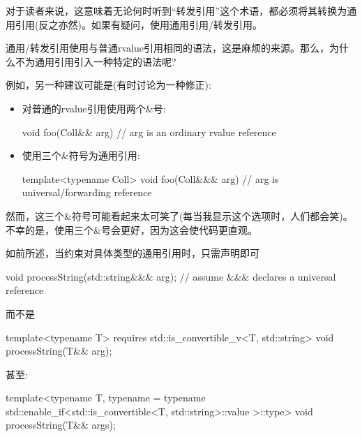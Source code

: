 对于读者来说，这意味着无论何时听到“转发引用”这个术语，都必须将其转换为通用引用(反之亦然)。如果有疑问，使用通用引用/转发引用。\par


通用/转发引用使用与普通rvalue引用相同的语法，这是麻烦的来源。那么，为什么不为通用引用引入一种特定的语法呢?\par

例如，另一种建议可能是(有时讨论为一种修正):\par

\begin{itemize}
  \item 对普通的rvalue引用使用两个\&号:
\begin{codebox}[cpp]
  void foo(Coll&& arg) // arg is an ordinary rvalue reference
\end{codebox}
  \item 使用三个\&符号为通用引用:
\begin{codebox}[cpp]
  template<typename Coll>
  void foo(Coll&&& arg) // arg is universal/forwarding reference
\end{codebox}
\end{itemize}

然而，这三个\&符号可能看起来太可笑了(每当我显示这个选项时，人们都会笑)。不幸的是，使用三个\&号会更好，因为这会使代码更直观。\par

如前所述，当约束对具体类型的通用引用时，只需声明即可\par

\begin{codebox}[cpp]
void processString(std::string&&& arg); // assume &&& declares a universal reference
\end{codebox}

而不是\par

\begin{codebox}[cpp]
template<typename T>
requires std::is_convertible_v<T, std::string>
void processString(T&& arg);
\end{codebox}

甚至:\par

\begin{codebox}[cpp]
template<typename T,
  typename =
    typename std::enable_if<std::is_convertible<T, std::string>::value
      >::type>
void processString(T&& args);
\end{codebox}

